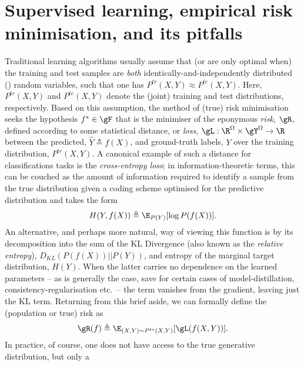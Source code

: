 \section{Supervised learning, empirical risk minimisation, and its pitfalls}\label{sec:erm}
%
Traditional learning algorithms usually assume  that (or are only optimal when) the training and
test samples are \emph{both} identically-and-independently distributed (\iid{}) random variables,
such that one has \( P^{tr}(X, Y) \approx P^{te}(X, Y) \). 
%
Here, \( P^{tr}(X, Y) \) and \( P^{te}(X, Y) \) denote the (joint) training and test distributions,
respectively.
%
Based on this assumption, the method of (true) risk minimisation seeks the hypothesis \( f^\ast \in
\gF \) that is the minimiser of the eponymous \emph{risk}, $\gR$, defined according to some
statistical distance, or \emph{loss}, \( \gL: \R^\Omega \times \gY^\Omega \to \R \) between the
predicted, \(\hat{Y} \triangleq f(X) \), and ground-truth labels, \(Y\) over the training
distribution, \(P^{tr}(X, Y)\). 
%
A canonical example of such a distance for classifications tasks is the \emph{cross-entropy loss};
in information-theoretic terms, this can be couched as the amount of information required to
identify a sample from the true distribution given a coding scheme optimised for the predictive
distribution and takes the form
%
\begin{equation}
    H(Y, f(X)) \triangleq \E_{P(Y)}[ \log P(f(X)) ].
\end{equation}
%
An alternative, and perhaps more natural, way of viewing this function is by its decomposition into
the sum of the \ac{KL} Divergence (also known as the \emph{relative entropy}),
\(D_{KL}(P(f(X))||P(Y))\), and entropy of the marginal target distribution, \(H(Y)\). 
%
When the latter carries no dependence on the learned parameters -- as is generally the case, save
for certain cases of model-distillation, consistency-regularisation etc.\ -- the term vanishes from
the gradient, leaving just the \acs{KL} term.
%
Returning from this brief aside, we can formally define the (population or true) risk as
%
\begin{equation}\label{eq:pop_risk} 
    \gR (f) \triangleq \E_{ (X, Y) \sim P^{tr}(X, Y) } [ \gL ( f(X, Y) )].
\end{equation}
%
In practice, of course, one does not have access to the true generative distribution, but only a
